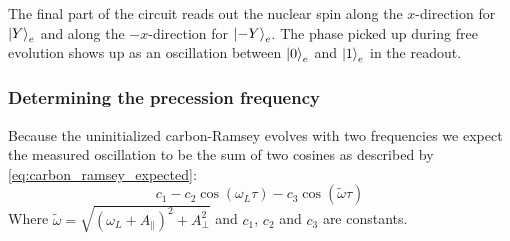 The final part of the circuit reads out the nuclear spin along the $x$-direction for ${\left\vert{Y}\right\rangle}_e$ and along the $-x$-direction for ${\left\vert{-Y}\right\rangle}_e$.
The phase picked up during free evolution shows up as an oscillation between ${\left\vert{0}\right\rangle}_e$ and ${\left\vert{1}\right\rangle}_e$ in the readout.

\subsubsection{Determining the precession frequency}
Because the uninitialized carbon-Ramsey evolves with two frequencies we expect the measured oscillation to be the sum of two cosines as described by \cref{eq:carbon_ramsey_expected}:
\begin{equation}
    c_1 - c_2 \cos(\omega_L \tau ) -c_3  \cos (\tilde{\omega} \tau )
    \label{eq:carbon_ramsey_expected}
\end{equation}
Where $ \tilde\omega =   \sqrt{(\omega_L+A_\parallel) ^2 + A_\perp^2} $ and $c_1$, $c_2$ and $c_3$ are constants.


